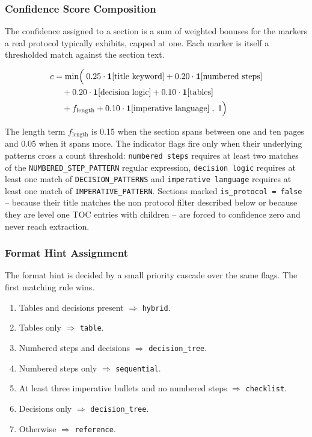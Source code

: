\documentclass{article}
\begin{document}
\subsubsection{Confidence Score Composition}

The confidence assigned to a section is a sum of weighted bonuses for
the markers a real protocol typically exhibits, capped at one. Each
marker is itself a thresholded match against the section text.

\begin{align}
c &= \min\!\Big(\;
      0.25 \cdot \mathbf{1}[\text{title keyword}]
    + 0.20 \cdot \mathbf{1}[\text{numbered steps}] \notag \\
    &\quad + 0.20 \cdot \mathbf{1}[\text{decision logic}]
    + 0.10 \cdot \mathbf{1}[\text{tables}] \notag \\
    &\quad + f_{\text{length}}
    + 0.10 \cdot \mathbf{1}[\text{imperative language}]
    \;,\; 1\Big)
\end{align}

The length term $f_{\text{length}}$ is 0.15 when the section spans
between one and ten pages and 0.05 when it spans more. The indicator
flags fire only when their underlying patterns cross a count
threshold: \texttt{numbered steps} requires at least two matches of
the \texttt{NUMBERED\_STEP\_PATTERN} regular expression,
\texttt{decision logic} requires at least one match of
\texttt{DECISION\_PATTERNS} and \texttt{imperative language} requires
at least one match of \texttt{IMPERATIVE\_PATTERN}. Sections marked
\texttt{is\_protocol = false} -- because their title matches the
non protocol filter described below or because they are level one
TOC entries with children -- are forced to confidence zero and never
reach extraction.

\subsubsection{Format Hint Assignment}

The format hint is decided by a small priority cascade over the same
flags. The first matching rule wins.

\begin{enumerate}[leftmargin=2em]
    \item Tables and decisions present $\Rightarrow$ \texttt{hybrid}.
    \item Tables only $\Rightarrow$ \texttt{table}.
    \item Numbered steps and decisions $\Rightarrow$
        \texttt{decision\_tree}.
    \item Numbered steps only $\Rightarrow$ \texttt{sequential}.
    \item At least three imperative bullets and no numbered steps
        $\Rightarrow$ \texttt{checklist}.
    \item Decisions only $\Rightarrow$ \texttt{decision\_tree}.
    \item Otherwise $\Rightarrow$ \texttt{reference}.
\end{enumerate}
\end{document}

